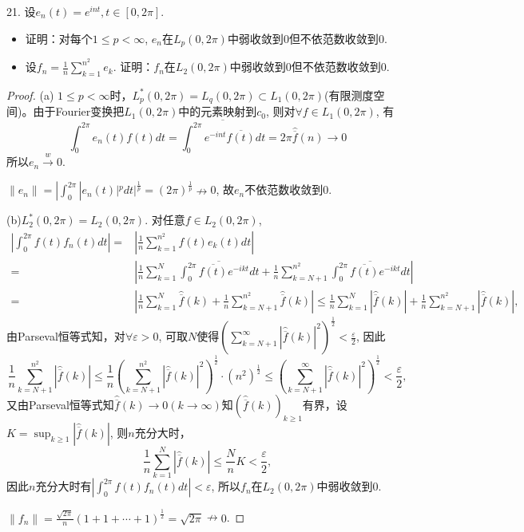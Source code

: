\documentclass[a4paper,8pt]{ctexart}\textwidth 140mm \textheight 216mm
\newcommand{\e}{\varepsilon}
\newcommand{\8}{\infty}
\begin{document}
21. 设$e_n(t)=e^{int},t\in[0,2\pi]$.
\begin{itemize}
	\item[(a)] 证明：对每个$1\leq p<\infty$, $e_n$在$L_p(0,2\pi)$中弱收敛到$0$但不依范数收敛到$0$.
	\item[(b)] 设$f_n=\frac{1}{n}\sum_{k=1}^{n^2}e_k$. 证明：$f_n$在$L_2(0,2\pi)$中弱收敛到$0$但不依范数收敛到$0$.
\end{itemize}
\begin{proof}
	(a) $1\leq p<\infty$时，$L_p^*(0,2\pi)=L_q(0,2\pi)\subset L_1(0,2\pi)$(有限测度空间)。由于Fourier变换把$L_1(0,2\pi)$中的元素映射到$c_0$, 则对$\forall f\in L_1(0,2\pi)$, 有
	\begin{equation*}
	\int_0^{2\pi} e_n(t)f(t)dt=\overline{\int_0^{2\pi}e^{-int}\overline{f(t)}dt}=2\pi\hat{\overline{f}}(n)\to 0
	\end{equation*}
	所以$e_n\stackrel{w}{\to} 0$. 
	
	$\|e_n\|=|\int_0^{2\pi}|e_n(t)|^pdt|^{\frac{1}{p}}=(2\pi)^{\frac{1}{p}}\nrightarrow 0$, 故$e_n$不依范数收敛到0.
	
	(b)$L_2^*(0,2\pi)=L_2(0,2\pi)$. 对任意$f\in L_2(0,2\pi)$, 
	\begin{equation*}
	\begin{split}
	|\int_0^{2\pi}f(t)f_n(t)dt|=&|\frac{1}{n}\sum_{k=1}^{n^2}f(t)e_k(t)dt|\\
	=&\left|\frac{1}{n}\sum_{k=1}^N\overline{\int_{0}^{2\pi}\overline{f(t)}e^{-ikt}dt}+\frac{1}{n}\sum_{k=N+1}^{n^2}\overline{\int_{0}^{2\pi}\overline{f(t)}e^{-ikt}dt}\right|\\
	=&\left|\frac{1}{n}\sum_{k=1}^N\hat{\overline{f}}(k)+\frac{1}{n}\sum_{k=N+1}^{n^2}\hat{\overline{f}}(k)\right|\leq \frac{1}{n}\sum_{k=1}^N|\hat{\overline{f}}(k)|+\frac{1}{n}\sum_{k=N+1}^{n^2}|\hat{\overline{f}}(k)|,
	\end{split}
	\end{equation*}
	由Parseval恒等式知，对$\forall \e>0$, 可取$N$使得$(\sum_{k=N+1}^{\infty}|\hat{\overline{f}}(k)|^2)^{\frac{1}{2}}<\frac{\e}{2}$, 因此
	$$\frac{1}{n}\sum_{k=N+1}^{n^2}|\hat{\overline{f}}(k)|\leq \frac{1}{n}(\sum_{k=N+1}^{n^2}|\hat{\overline{f}}(k)|^2)^{\frac{1}{2}}\cdot(n^2)^{\frac{1}{2}}\leq(\sum_{k=N+1}^{\infty}|\hat{\overline{f}}(k)|^2)^{\frac{1}{2}}<\frac{\e}{2},$$
	又由Parseval恒等式知$\hat{\overline{f}}(k)\to 0(k\to\infty)$知$(\hat{\overline{f}}(k))_{k\geq 1}$有界，设$K=\sup_{k\geq 1}|\hat{\overline{f}}(k)|$, 则$n$充分大时，
	$$\frac{1}{n}\sum_{k=1}^N|\hat{\overline{f}}(k)|\leq \frac{N}{n}K<\frac{\e}{2},$$
	因此$n$充分大时有$|\int_0^{2\pi}f(t)f_n(t)dt|<\e$, 所以$f_n$在$L_2(0,2\pi)$中弱收敛到$0$. 
	
	$\|f_n\|=\frac{\sqrt{2\pi}}{n}(1+1+\cdots+1)^{\frac{1}{2}}=\sqrt{2\pi}\nrightarrow0$.
\end{proof}
\end{document}
